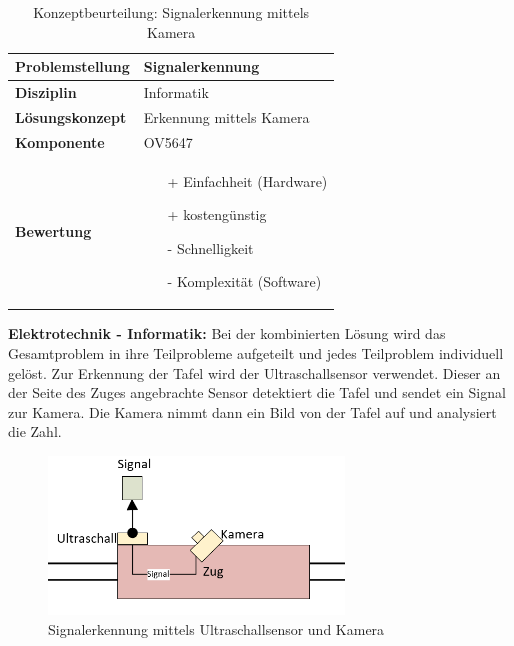 \documentclass[../../main.tex]{subfiles}
\begin{document}
    \begin{flushleft}
        \begin{table}[H]
        \begin{tabular}{ | l | p{11cm} |}
        \hline
        \textbf{Problemstellung} & Signalerkennung \\ \hline
        \textbf{Disziplin} & Informatik \\ \hline
        \textbf{Lösungskonzept} & Erkennung mittels Kamera \\ \hline
        \textbf{Komponente} & OV5647 \\ \hline
        \textbf{Bewertung} &  \begin{itemize}
                                \item[+] Einfachheit (Hardware)
                                \item[+] kostengünstig
                                \item[-] Schnelligkeit
                                \item[-] Komplexität (Software)   
                              \end{itemize} \\ \hline
        \end{tabular}
        \caption{Konzeptbeurteilung: Signalerkennung mittels Kamera}
        \label{tab:konzept_wurfel_Stereokamera}
    \end{table}
    \end{flushleft}

    \textbf{Elektrotechnik - Informatik: }
    Bei der kombinierten Lösung wird das Gesamtproblem in ihre Teilprobleme aufgeteilt und jedes Teilproblem
    individuell gelöst. Zur Erkennung der Tafel wird der Ultraschallsensor verwendet. Dieser an der Seite des Zuges
    angebrachte Sensor detektiert die Tafel und sendet ein Signal zur Kamera. Die Kamera nimmt dann ein Bild von der Tafel
    auf und analysiert die Zahl.\\

    \begin{figure}[H]
        \centering
        \includegraphics[width=0.7\textwidth]{signal_kombi.png}
        \caption{Signalerkennung mittels Ultraschallsensor und Kamera}
    \end{figure}
\end{document}
